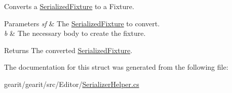 Converts a \hyperlink{structgearit_1_1src_1_1editor_1_1_serialized_fixture}{Serialized\+Fixture} to a Fixture. 


\begin{DoxyParams}{Parameters}
{\em sf} & The \hyperlink{structgearit_1_1src_1_1editor_1_1_serialized_fixture}{Serialized\+Fixture} to convert.\\
\hline
{\em b} & The necessary body to create the fixture.\\
\hline
\end{DoxyParams}
\begin{DoxyReturn}{Returns}
The converted \hyperlink{structgearit_1_1src_1_1editor_1_1_serialized_fixture}{Serialized\+Fixture}.
\end{DoxyReturn}


The documentation for this struct was generated from the following file\+:\begin{DoxyCompactItemize}
\item 
gearit/gearit/src/\+Editor/\hyperlink{_serializer_helper_8cs}{Serializer\+Helper.\+cs}\end{DoxyCompactItemize}
